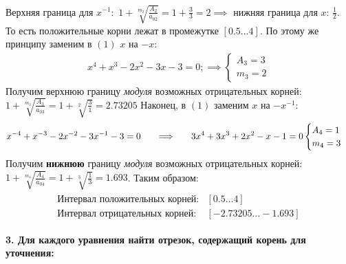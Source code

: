 Верхняя граница для $x^{-1}:$ $1+\sqrt[m_2]{\frac{A_2}{a_{02}}} = 1 +\frac{3}{3} = 2\implies$ нижняя граница для $x$: $\frac{1}{2}$. То есть положительные корни лежат в промежутке $[0.5\ldots4]$.
По этому же принципу заменим в $(1)$ $x$ на $-x$:
\begin{align}
    x^4+x^3-2x^2-3x-3=0; \implies
     \begin{cases}
        A_3 = 3 \\
        m_3 = 2
    \end{cases}
\end{align}
Получим верхнюю границу {\it модуля} возможных отрицательных корней: $1+\sqrt[m_3]{\frac{A_3}{a_{03}}} = 1 +\sqrt[2]{\frac{3}{1}} = 2.73205$
Наконец, в $(1)$ заменим $x$ на $-x^{-1}$:
\begin{align}
    x^{-4}+x^{-3}-2x^{-2}-3x^{-1}-3=0 \hspace{0.5cm} \implies \hspace{0.5cm}
    3x^4+3x^3+2x^2-x-1=0
    \begin{cases}
        A_4 = 1 \\
        m_4 = 3
    \end{cases}
\end{align}
Получим {\bf нижнюю} границу {\it модуля} возможных отрицательных корней: $1+\sqrt[m_4]{\frac{A_4}{a_{04}}} = 1 +\sqrt[3]{\frac{1}{3}} = 1.693$. Таким образом:
\begin{align}
    \begin{matrix}
        \text{Интервал положительных корней:} & [0.5 \ldots 4] \\
        \text{Интервал отрицательных корней:} & [-2.73205 \ldots -1.693]
    \end{matrix}
\end{align}

{\Large{\textbf{3. Для каждого уравнения найти отрезок, содержащий корень для уточнения:}}}\\

